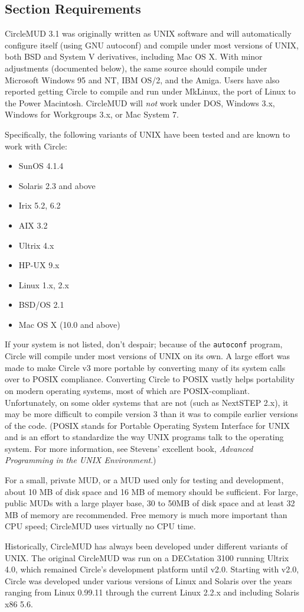 \documentclass[11pt]{article}
\begin{document}
\subsection{Section Requirements}
CircleMUD 3.1 was originally written as UNIX software and will automatically configure itself (using GNU autoconf) and compile under most versions of UNIX, both BSD and System V derivatives, including Mac OS X.  With minor adjustments (documented below), the same source should compile under Microsoft Windows 95 and NT, IBM OS/2, and the Amiga.  Users have also reported getting Circle to compile and run under MkLinux, the port of Linux to the Power Macintosh.  CircleMUD will {\em not} work under DOS, Windows 3.x, Windows for Workgroups 3.x, or Mac System 7.
\par
Specifically, the following variants of UNIX have been tested and are known to work with Circle:
\begin{itemize}
\item SunOS 4.1.4
\item Solaris 2.3 and above
\item Irix 5.2, 6.2
\item AIX 3.2
\item Ultrix 4.x
\item HP-UX 9.x
\item Linux 1.x, 2.x
\item BSD/OS 2.1
\item Mac OS X (10.0 and above)
\end{itemize}
If your system is not listed, don't despair; because of the \texttt{autoconf} program, Circle will compile under most versions of UNIX on its own.  A large effort was made to make Circle v3 more portable by converting many of its system calls over to POSIX compliance.  Converting Circle to POSIX vastly helps portability on modern operating systems, most of which are POSIX-compliant.  Unfortunately, on some older systems that are not (such as NextSTEP 2.x), it may be more difficult to compile version 3 than it was to compile earlier versions of the code.  (POSIX stands for Portable Operating System Interface for UNIX and is an effort to standardize the way UNIX programs talk to the operating system.  For more information, see Stevens' excellent book, {\em Advanced Programming in the UNIX Environment}.)
\par
For a small, private MUD, or a MUD used only for testing and development, about 10 MB of disk space and 16 MB of memory should be sufficient. For large, public MUDs with a large player base, 30 to 50MB of disk space and at least 32 MB of memory are recommended.  Free memory is much more important than CPU speed; CircleMUD uses virtually no CPU time.
\par
Historically, CircleMUD has always been developed under different variants of UNIX.  The original CircleMUD was run on a DECstation 3100 running Ultrix 4.0, which remained Circle's development platform until v2.0.  Starting with v2.0, Circle was developed under various versions of Linux and Solaris over the years ranging from Linux 0.99.11 through the current Linux 2.2.x and including Solaris x86 5.6.
\end{document}
